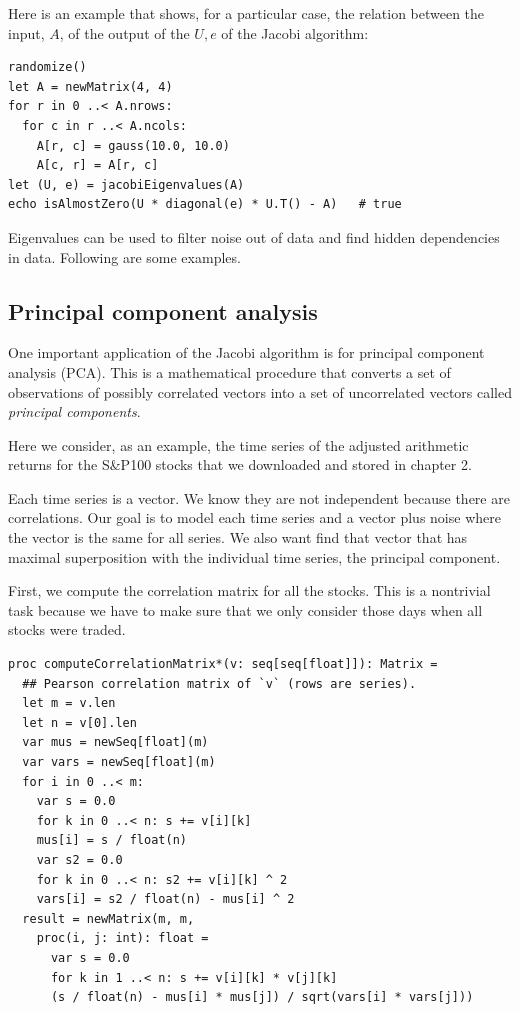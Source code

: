 \documentclass[justified, sixbynine]{tufte-book}
\def\ft{\small\tt}
\theoremstyle{plain}%
\newtheorem * {corollary}{Corollary}
\theoremstyle{definition}
\theoremstyle{remark}
\newtheorem * {remark}{Remark}
\newtheorem * {note}{Note}
\begin{document}
\begin{fullwidth}
Here is an example that shows, for a particular case, the relation between the input, $A$, of the output of the $U, e$ of the Jacobi algorithm:

\begin{lstlisting}
randomize()
let A = newMatrix(4, 4)
for r in 0 ..< A.nrows:
  for c in r ..< A.ncols:
    A[r, c] = gauss(10.0, 10.0)
    A[c, r] = A[r, c]
let (U, e) = jacobiEigenvalues(A)
echo isAlmostZero(U * diagonal(e) * U.T() - A)   # true
\end{lstlisting}

Eigenvalues can be used to filter noise out of data and find hidden dependencies in data. Following are some examples.

\goodbreak\subsection{Principal component analysis}


One important application of the Jacobi algorithm is for principal component analysis (PCA). This is a mathematical procedure that converts a set of observations of possibly correlated vectors into a set of uncorrelated vectors called {\it principal components}.

Here we consider, as an example, the time series of the adjusted arithmetic returns for the S\&P100 stocks that we downloaded and stored in chapter 2.

Each time series is a vector. We know they are not independent because there are correlations. Our goal is to model each time series and a vector plus noise where the vector is the same for all series. We also want find that vector that has maximal superposition with the individual time series, the principal component.

First, we compute the correlation matrix for all the stocks. This is a nontrivial task because we have to make sure that we only consider those days when all stocks were traded. %


\begin{lstlisting}[caption={in file: {\ft nlib.nim}}]
proc computeCorrelationMatrix*(v: seq[seq[float]]): Matrix =
  ## Pearson correlation matrix of `v` (rows are series).
  let m = v.len
  let n = v[0].len
  var mus = newSeq[float](m)
  var vars = newSeq[float](m)
  for i in 0 ..< m:
    var s = 0.0
    for k in 0 ..< n: s += v[i][k]
    mus[i] = s / float(n)
    var s2 = 0.0
    for k in 0 ..< n: s2 += v[i][k] ^ 2
    vars[i] = s2 / float(n) - mus[i] ^ 2
  result = newMatrix(m, m,
    proc(i, j: int): float =
      var s = 0.0
      for k in 1 ..< n: s += v[i][k] * v[j][k]
      (s / float(n) - mus[i] * mus[j]) / sqrt(vars[i] * vars[j]))
\end{lstlisting}


\end{fullwidth}
\end{document}
